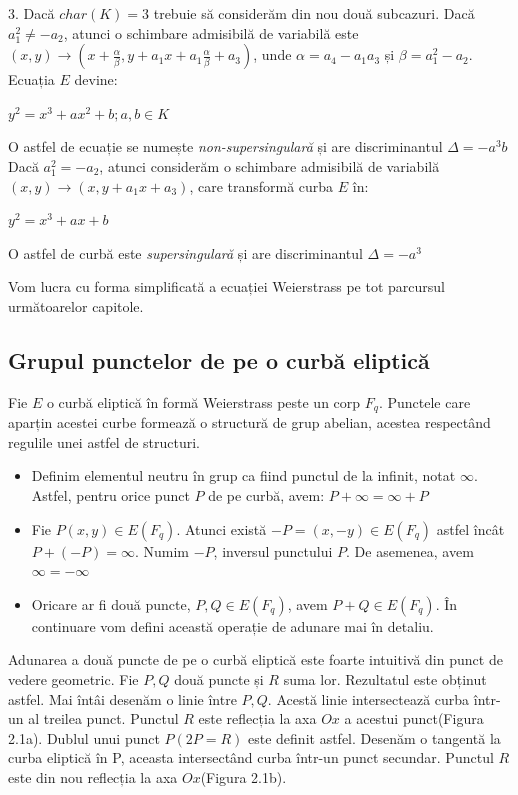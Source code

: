 \begin{dfn}
3. Dacă $char(K) = 3$ trebuie să considerăm din nou două subcazuri. Dacă $a_1^2 \neq -a_2$, atunci o schimbare admisibilă de variabilă este
$(x, y) \rightarrow (x + \frac{\alpha}{\beta}, y + a_1x + a_1\frac{\alpha}{\beta} + a_3)$, unde $\alpha = a_4 -a_1a_3$ și $\beta = a_1^2 - a_2$. Ecuația $E$ devine: 
\begin{center} $y^2 = x^3 + ax^2 + b; a, b\in K$\end{center}
O astfel de ecuație se numește \textit{non-supersingulară} și are discriminantul $\Delta = -a^3b$ \\
Dacă $a_1^2 = -a_2$, atunci considerăm o schimbare admisibilă de variabilă $(x, y) \rightarrow (x, y + a_1x + a_3)$, care transformă curba $E$ în:
\begin{center} $y^2 = x^3 + ax + b$ \end{center}
O astfel de curbă este \textit{supersingulară} și are discriminantul $\Delta = -a^3$
\end{dfn}

\begin{obs}
Vom lucra cu forma simplificată a ecuației Weierstrass pe tot parcursul următoarelor capitole.
\end{obs}

\subsection{Grupul punctelor de pe o curbă eliptică}
\label{subsec:subsec01}
Fie $E$ o curbă eliptică în formă Weierstrass peste un corp $F_q$. Punctele care aparțin acestei curbe formează o structură de grup abelian, acestea respectând regulile unei astfel de structuri.

\begin{itemize}
  \item Definim elementul neutru în grup ca fiind punctul de la infinit, notat $\infty$. Astfel, pentru orice punct $P$ de pe curbă, avem: $P + \infty = \infty + P$
  \item Fie $P(x, y)\in E(F_q)$. Atunci există $-P = (x, -y) \in E(F_q)$ astfel încât $P+ (-P) = \infty$. Numim $-P$, inversul punctului $P$. De asemenea, avem $\infty = -\infty$
  \item Oricare ar fi două puncte, $P, Q\in E(F_q)$, avem $P + Q \in E(F_q)$. În continuare vom defini această operație de adunare mai în detaliu.
\end{itemize}

\begin{dfn}
Adunarea a două puncte de pe o curbă eliptică este foarte intuitivă din punct de vedere geometric. Fie $P, Q$ două puncte și $R$ suma lor. Rezultatul este obținut astfel. Mai întâi desenăm o linie între $P, Q$. Acestă linie intersectează curba într-un al treilea punct. Punctul $R$ este reflecția la axa $Ox$ a acestui punct(Figura 2.1a). Dublul unui punct $P(2P = R)$ este definit astfel. Desenăm o tangentă la curba eliptică în P, aceasta intersectând curba într-un punct secundar. Punctul $R$ este din nou reflecția la axa $Ox$(Figura 2.1b).  
\end{dfn}

